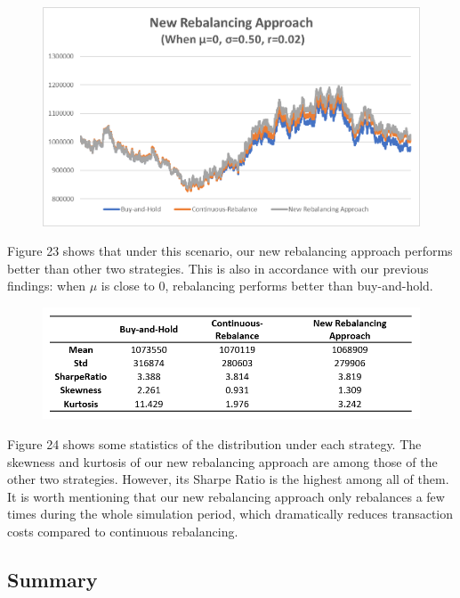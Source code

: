\documentclass[
10pt, %
a4paper, %
oneside, %
headinclude,footinclude, %
BCOR5mm, %
]{scrartcl}
\begin{document}
\begin{figure}[H]
	\centering
	\includegraphics[width=0.7\linewidth]{newApproach}
	\caption{}
	\label{fig:newapproach}
\end{figure}

Figure 23 shows that under this scenario, our new rebalancing approach performs better than other two strategies. This is also in accordance with our previous findings: when $\mu$ is close to 0, rebalancing performs better than buy-and-hold.\\

\begin{figure}[H]
	\centering
	\large
	\includegraphics[width=1.0\linewidth]{newApproachTable}
	\caption{}
	\label{fig:newapproachtable}
\end{figure}

Figure 24 shows some statistics of the distribution under each strategy. The skewness and kurtosis of our new rebalancing approach are among those of the other two strategies. However, its Sharpe Ratio is the highest among all of them.\\

It is worth mentioning that our new rebalancing approach only rebalances a few times during the whole simulation period, which dramatically reduces transaction costs compared to continuous rebalancing.\\

\subsection{Summary}
\end{document}
